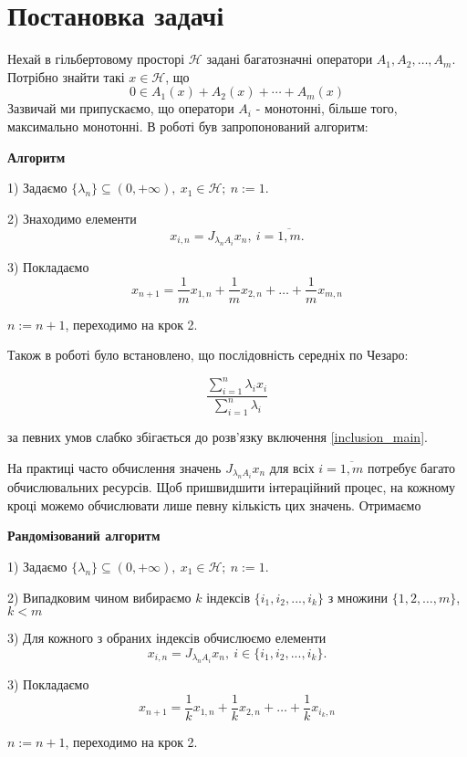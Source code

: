 \documentclass[main.tex]{subfile}
\begin{document}
	\section{Постановка задачі}
	Нехай в гільбертовому просторі $\mathcal{H}$ задані багатозначні оператори $A_1, A_2, \ldots, A_m$. Потрібно знайти такі $x \in \mathcal{H}$, що 
	\begin{equation}
		0 \in A_1(x) + A_2(x) + \cdots + A_m(x)
		\label{inclusion_main}
	\end{equation}  
	Зазвичай ми припускаємо, що оператори $A_i$ - монотонні, більше того, максимально монотонні. 
	В роботі \cite{semenov_dec} був запропонований алгоритм:
	
	{\small
		\itshape
		\begin{center}
			 \bfseries Алгоритм
		\end{center}

		
		1) Задаємо $\{\lambda_n\} \subseteq (0, +\infty), \ x_1 \in \mathcal{H}; \ n:=1.$
		
		
		2) Знаходимо елементи
		\[x_{i, n} = J_{\lambda_nA_i}x_n, \ i=\overline{1, m}.\]
		
		3) Покладаємо
		\[x_{n+1} = \frac{1}{m}x_{1, n} + \frac{1}{m}x_{2, n} + \ldots + \frac{1}{m}x_{m, n}\]
		
		$n:=n+1$, переходимо на крок 2.
	}
	
	Також в роботі \cite{semenov_article} було встановлено, що послідовність середніх по Чезаро:
	
	\begin{equation}
		\frac{\sum_{i=1}^{n} \lambda_i x_i}{\sum_{i=1}^{n} \lambda_i}
		\label{chesaro_mean}
	\end{equation}

	
	за певних умов слабко збігається до розв'язку включення \ref{inclusion_main}.
	
	На практиці часто обчислення значень $J_{\lambda_nA_i}x_n$ для всіх $i = \overline{1, m}$ потребує багато обчислювальних ресурсів. Щоб пришвидшити інтераційний процес, на кожному кроці можемо обчислювати лише певну кількість цих значень. Отримаємо 
	{\small
		\itshape
		\begin{center}
			\bfseries Рандомізований алгоритм
		\end{center}
		
		
		1) Задаємо $\{\lambda_n\} \subseteq (0, +\infty), \ x_1 \in \mathcal{H}; \ n:=1.$
		
		2) Випадковим чином вибираємо $k$ індексів $\{i_1, i_2, ..., i_k\}$ з множини $\{1, 2, \ldots, m\}$, $k < m$
		
		3) Для кожного з обраних індексів обчислюємо елементи
		\[x_{i, n} = J_{\lambda_nA_i}x_n, \ i  \in \{i_1, i_2, ..., i_k\}.\]
		
		3) Покладаємо
		\[x_{n+1} = \frac{1}{k}x_{1, n} + \frac{1}{k}x_{2, n} + \ldots + \frac{1}{k}x_{i_k, n}\]
		
		$n:=n+1$, переходимо на крок 2.
	}
\end{document}

